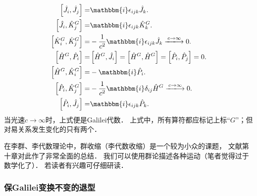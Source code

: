 \begin{subequations}
    \begin{align}
        \left[\hat{J}_i, \hat{J}_j \right] =& \mathbbm{i} \epsilon_{ijk} \hat{J}_k . \\
        \left[\hat{J}_i, \hat{K}_j^G\right] =& \mathbbm{i} \epsilon_{ijk} \hat{K}_k ^G. \\
        \left[\hat{K}_i^G, \hat{K}_j^G\right] =& -\frac{1}{c^2}\mathbbm{i}\epsilon_{ijk} \hat{J}_k 
        \xlongrightarrow{c\to \infty} 0. \\
        \left[\hat{H}^G, \hat{P}_i \right] =& \left[\hat{H}^G, \hat{J}_i \right]
        =\left[\hat{H}^G, \hat{H}^G \right] =\left[\hat{P}_i, \hat{P}_j \right] =0 . \\
        \left[\hat{H}^G, \hat{K}^G_i \right] = & -\mathbbm{i} \hat{P}_i .\\
        \left[\hat{P}_i, \hat{K}^G_j \right] =& -\frac{1}{c^2}\mathbbm{i} \delta_{ij} \hat{H}^G 
        \xlongrightarrow{c\to \infty} 0.\\
        \left[\hat{P}_i, \hat{J}_j \right] =& \mathbbm{i} \epsilon_{ijk} \hat{P}_k .
    \end{align}
\end{subequations}
当光速$c\to \infty$时，上式便是Galilei代数．
上式中，所有算符都应标记上标“$G$”；但对易关系发生变化的只有两个．

在李群、李代数理论中，群收缩（李代数收缩）是一个较为小众的课题，
文献\parencite{Gilmore-1974}第十章对此作了非常全面的总结．
我们可以使用群论描述各种运动\cite{McRae-2007}（笔者觉得过于数学化了）．
若读者有兴趣可仔细研读．

\subsubsection{保Galilei变换不变的退型}\label{chlg:sec_Galilei-metric}

